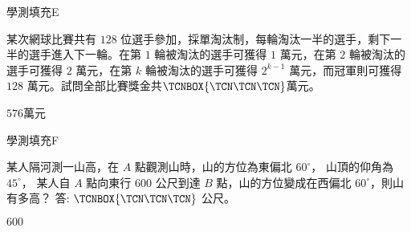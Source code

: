     \begin{QUESTION}
        \begin{ExamInfo}{91}{學測}{填充}{E}
        \end{ExamInfo}
        \begin{ExamAnsRateInfo}{41}{70}{41}{12}
        \end{ExamAnsRateInfo}
        \begin{QBODY}
            某次網球比賽共有 $128$ 位選手參加，採單淘汰制，每輪淘汰一半的選手，剩下一半的選手進入下一輪。在第 $1$ 輪被淘汰的選手可獲得 $1$ 萬元，在第 $2$ 輪被淘汰的選手可獲得 $2$ 萬元，在第 $k$ 輪被淘汰的選手可獲得 $2^{k-1}$ 萬元，而冠軍則可獲得 $128$ 萬元。試問全部比賽獎金共$\TCNBOX{\TCN\TCN\TCN}$萬元。
        \end{QBODY}
        \begin{QFROMS}
        \end{QFROMS}
        \begin{QTAGS}\end{QTAGS}
        \begin{QANS}
            $576$萬元
        \end{QANS}
        \begin{QSOLLIST}
        \end{QSOLLIST}
        \begin{QEMPTYSPACE}
        \end{QEMPTYSPACE}
    \end{QUESTION}
    \begin{QUESTION}
        \begin{ExamInfo}{91}{學測}{填充}{F}
        \end{ExamInfo}
        \begin{ExamAnsRateInfo}{51}{89}{50}{14}
        \end{ExamAnsRateInfo}
        \begin{QBODY}
            某人隔河測一山高，在 $A$ 點觀測山時，山的方位為東偏北 $60^\circ$，
            山頂的仰角為 $45^\circ$，
            某人自 $A$ 點向東行 $600$ 公尺到達 $B$ 點，山的方位變成在西偏北 $60^\circ$，則山有多高？ 答: $
            \TCNBOX{\TCN\TCN\TCN}$ 公尺。
        \end{QBODY}
        \begin{QFROMS}
        \end{QFROMS}
        \begin{QTAGS}\end{QTAGS}
        \begin{QANS}
            $600$
        \end{QANS}
        \begin{QSOLLIST}
        \end{QSOLLIST}
        \begin{QEMPTYSPACE}
        \end{QEMPTYSPACE}
    \end{QUESTION}
